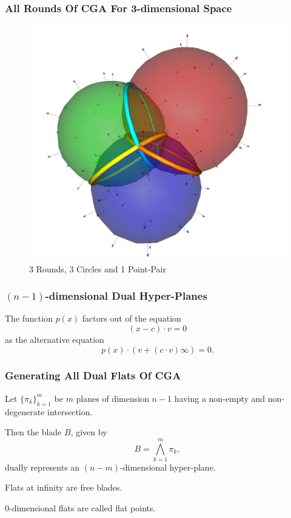 \documentclass{beamer}
\newcommand{\nvai}{\infty}
\begin{document}
\begin{frame}
\frametitle{All Rounds Of CGA For 3-dimensional Space}
\begin{figure}
\centering
\includegraphics[scale=0.2]{Rounds}
\caption{3 Rounds, 3 Circles and 1 Point-Pair}
\end{figure}
\end{frame}

\begin{frame}
\frametitle{$(n-1)$-dimensional \alert{Dual} Hyper-Planes}
\pause
The function $p(x)$ factors out of the equation
\begin{equation*}
(x-c)\cdot v = 0
\end{equation*}
as the alternative equation
\begin{equation*}
p(x)\cdot\left(v+(c\cdot v)\nvai\right) = 0.
\end{equation*}
\end{frame}

\begin{frame}
\frametitle{Generating All \alert{Dual Flats} Of CGA}
\pause
Let $\{\pi_k\}_{k=1}^m$ be $m$ planes of dimension $n-1$ having a \alert{non-empty} and
\alert{non-degenerate} intersection.\pause

Then the blade $B$, given by
\begin{equation*}
B = \bigwedge_{k=1}^m\pi_k,
\end{equation*}
\alert{dually} represents an $(n-m)$-dimensional hyper-plane.\pause

\alert{Flats} at infinity are \alert{free blades}.\pause

$0$-dimensional \alert{flats} are called \alert{flat points}.
\end{frame}
\end{document}
